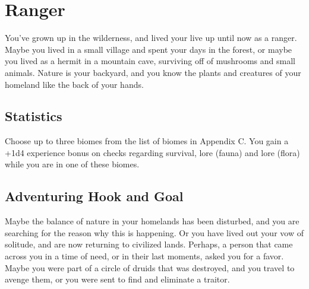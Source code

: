 \section{Ranger}\label{background:ranger}
You've grown up in the wilderness, and lived your live up until now as a ranger.
Maybe you lived in a small village and spent your days in the forest, or maybe you lived as a hermit in a mountain cave, surviving off of mushrooms and small animals.
Nature is your backyard, and you know the plants and creatures of your homeland like the back of your hands.

\subsection{Statistics}
Choose up to three biomes from the list of biomes in Appendix C.
You gain a +1d4 experience bonus on checks regarding survival, lore (fauna) and lore (flora) while you are in one of these biomes.

\subsection{Adventuring Hook and Goal}
Maybe the balance of nature in your homelands has been disturbed, and you are searching for the reason why this is happening.
Or you have lived out your vow of solitude, and are now returning to civilized lands.
Perhaps, a person that came across you in a time of need, or in their last moments, asked you for a favor.
Maybe you were part of a circle of druids that was destroyed, and you travel to avenge them, or you were sent to find and eliminate a traitor.
